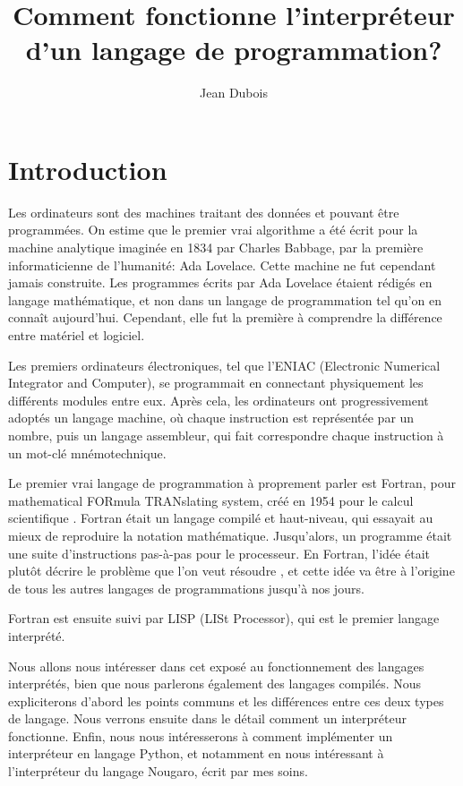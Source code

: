 \documentclass{article}
\title{Comment fonctionne l’interpréteur d’un langage de programmation\nobreakspace?}
\author{Jean Dubois}
\begin{document}
\maketitle

\section{Introduction}
Les ordinateurs sont des machines traitant des données et pouvant être programmées.
On estime que le premier vrai algorithme a été écrit pour la machine analytique imaginée
en 1834 par Charles Babbage, par la première informaticienne de l’humanité\nobreakspace:
Ada Lovelace. Cette machine ne fut cependant jamais construite. Les programmes écrits par
Ada Lovelace étaient rédigés en langage mathématique, et non dans un langage de programmation
tel qu’on en connaît aujourd’hui. Cependant, elle fut la première à comprendre la différence
entre matériel et logiciel. \cite[p. 454]{berry}

Les premiers ordinateurs électroniques, tel que l’ENIAC (Electronic Numerical Integrator and Computer),
se programmait en connectant physiquement les différents modules entre eux. \cite{britannica-eniac}
Après cela, les ordinateurs ont progressivement adoptés un langage machine, où chaque instruction est
représentée par un nombre, puis un langage assembleur, qui fait correspondre chaque instruction à
un mot-clé mnémotechnique. \cite{britannica-asm}

Le premier vrai langage de programmation à proprement parler est Fortran, pour mathematical
FORmula TRANslating system, créé en 1954 pour le calcul scientifique \cite[p. 455]{berry}.
Fortran était un langage compilé et haut-niveau, qui essayait au mieux de reproduire la
notation mathématique. Jusqu’alors, un programme était une suite d’instructions pas-à-pas pour
le processeur. En Fortran, l’idée était plutôt décrire le problème que l’on veut résoudre 
\cite{imb-john-backus}, et cette idée va être à l’origine de tous les autres langages de
programmations jusqu’à nos jours.

Fortran est ensuite suivi par LISP (LISt Processor), qui est le premier langage interprété.

Nous allons nous intéresser dans cet exposé au fonctionnement des langages interprétés,
bien que nous parlerons également des langages compilés. Nous expliciterons d’abord les
points communs et les différences entre ces deux types de langage. Nous verrons ensuite
dans le détail comment un interpréteur fonctionne. Enfin, nous nous intéresserons à
comment implémenter un interpréteur en langage Python, et notamment en nous intéressant
à l’interpréteur du langage Nougaro, écrit par mes soins.
\end{document}
